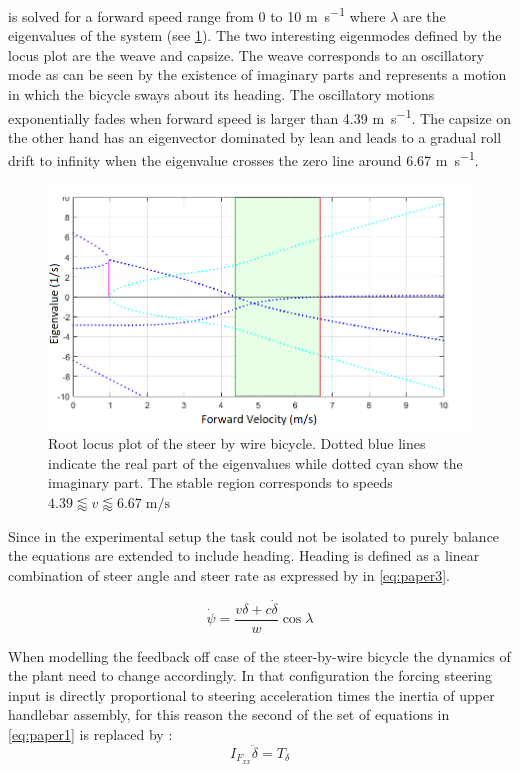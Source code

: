 is solved for a forward speed range from 0 to 10 \si{\meter\per\second} where \ensuremath{\lambda} are the eigenvalues of the system (see \cref{fig:paper2}). The two interesting eigenmodes defined by the locus plot are the weave and capsize. The weave corresponds to an oscillatory mode as can be seen by the existence of imaginary parts and represents a motion in which the bicycle sways about its heading. The oscillatory motions exponentially fades when forward speed is larger than 4.39 \si{\meter\per\second}. The capsize on the other hand has an eigenvector dominated by lean and leads to a gradual roll drift to infinity when the eigenvalue crosses the zero line around 6.67 \si{\meter\per\second}.
\begin{figure}[ht]
    \centering
    \captionsetup{justification=centering,margin=2cm}

    \includegraphics[scale=0.6]{images/root_locus_steerbywire.png}
    \caption{Root locus plot of the steer by wire bicycle. Dotted blue lines indicate the real part of the eigenvalues while dotted cyan show the imaginary part. The stable region corresponds to speeds  \ensuremath{4.39\lessapprox v \lessapprox 6.67\; \si{\meter\per\second}}}
    \label{fig:paper2}
\end{figure}
Since in the experimental setup the task could not be isolated to purely balance the equations are extended to include heading. Heading is defined as a linear combination of steer angle and steer rate as expressed by \citet{meijaard2007linearized} in \cref{eq:paper3}. 

\begin{equation}
    \dot{\psi}=\frac{v \delta+c \dot{\delta}}{w} \cos \lambda
    \label{eq:paper3}
    \end{equation}

When modelling the feedback off case of the steer-by-wire bicycle the dynamics of the plant need to change accordingly. In that configuration the forcing steering input is directly proportional to steering acceleration times the inertia of upper handlebar assembly, for this reason the second of the set of equations in \ref{eq:paper1} is replaced by :
\begin{equation}
    I_{F_{xx}}\ddot{\delta} = T_{\delta}
\end{equation}

